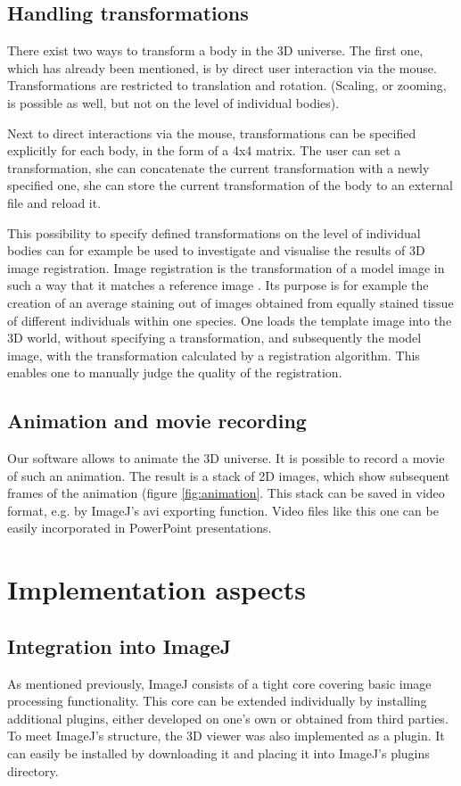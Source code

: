 \documentclass[a4paper,10pt]{article}
\begin{document}
\subsection{Handling transformations}
There exist two ways to transform a body in the 3D universe. The first one, which has already been mentioned, is by direct user interaction via the mouse. Transformations are restricted to translation and rotation. (Scaling, or zooming, is possible as well, but not on the level of individual bodies).

Next to direct interactions via the mouse, transformations can be specified explicitly for each body, in the form of a 4x4 matrix. The user can set a transformation, she can concatenate the current transformation with a newly specified one, she can store the current transformation of the body to an external file and reload it.

This possibility to specify defined transformations on the level of individual bodies can for example be used to investigate and visualise the results of 3D image registration. Image registration is the transformation of a model image in such a way that it matches a reference image \cite{jenett2006}. Its purpose is for example the creation of an average staining out of images obtained from equally stained tissue of different individuals within one species. One loads the template image into the 3D world, without specifying a transformation, and subsequently the model image, with the transformation calculated by a registration algorithm. This enables one to manually judge the quality of the registration.

\subsection{Animation and movie recording}
Our software allows to animate the 3D universe. It is possible to record a movie of such an animation. The result is a stack of 2D images, which show subsequent frames of the animation (figure \ref{fig:animation}. This stack can be saved in video format, e.g. by ImageJ's avi exporting function. Video files like this one can be easily incorporated in PowerPoint presentations.



\section{Implementation aspects}
\subsection*{Integration into ImageJ}
As mentioned previously, ImageJ consists of a tight core covering basic image processing functionality. This core can be extended individually by installing additional plugins, either developed on one's own or obtained from third parties.
To meet ImageJ's structure, the 3D viewer was also implemented as a plugin. It can easily be installed by downloading it and placing it into ImageJ's plugins directory.
\end{document}

